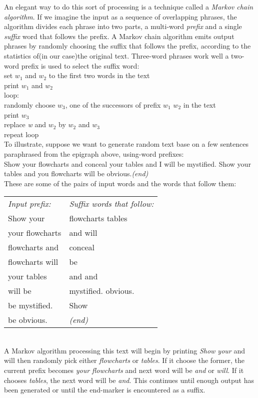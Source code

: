 An elegant way to do this sort of processing is a technique called a
\textit{Markov chain algorithm}. If we imagine the input as a sequence of
overlapping phrases, the algorithm divides each phrase into two parts, a
multi-word \textit{prefix} and a single \textit{suffix} word that follows
the prefix. A Markov chain algorithm emits output phrases by randomly
choosing the suffix that follows the prefix, according to the statistics
of(in our case)the original text. Three-word phrases work well a two-word
prefix is used to select the suffix word:
\\
\indent set \textit{$w_1$} and \textit{$w_2$} to the first two words in the text 
\\
\indent print \textit{$w_1$} and \textit{$w_2$} 
\\
\indent loop:
\\
\indent\indent randomly choose \textit{$w_3$}, one of the successors of
    prefix \textit{$w_1$} \textit{$w_2$} in the text
\\
\indent\indent print \textit{$w_{3}$}
\\
\indent\indent replace \textit{w} and \textit{$w_2$} by \textit{$w_2$} and
        \textit{$w_3$}
\\
\indent\indent repeat loop
\\
To illustrate, suppose we want to generate random text base on a few
sentences paraphrased from the epigraph above, using-word prefixes:
\\
\indent Show your flowcharts and conceal your tables and I will be
mystified. Show your tables and you flowcharts will be obvious.\textit{(end)}
\\
These are some of the pairs of input words and the words that follow them:
\\
\indent \begin{tabular}{ll}
    \textit{Input prefix:} & \textit{Suffix words that follow:}\\
    Show your & flowcharts tables\\
    your flowcharts & and will\\
    flowcharts and & conceal\\
    flowcharts will & be\\
    your tables & and and\\
    will be & mystified. obvious.\\
    be mystified. & Show\\
    be obvious. & \textit{(end)}
\indent \end{tabular} \\
A Markov algorithm processing this text will begin by printing \textit{Show
    your} and will then randomly pick either \textit{flowcharts} or
\textit{tables}. If it choose the former, the current prefix becomes
\textit{your flowcharts} and next word will be \textit{and} or
\textit{will}. If it chooses \textit{tables}, the next word will be
\textit{and}. This continues until enough output has been generated or
until the end-marker is encountered as a suffix.

